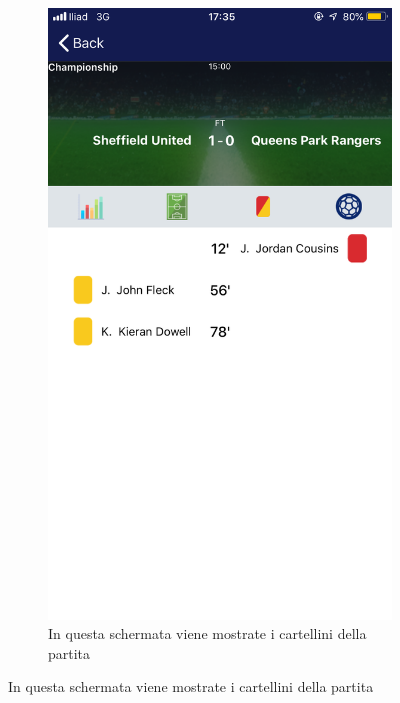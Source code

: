 \documentclass[numbers=noenddot, 12pt, a4paper, oneside]{scrbook}
\begin{document}
\begin{figure}[H]
\begin{subfigure}{.5\textwidth}
		\includegraphics[width=.8\linewidth]{images/Screen/Cards}
		\caption{In questa schermata viene mostrate i cartellini della partita}
	\end{subfigure}
\end{figure}
\end{document}
